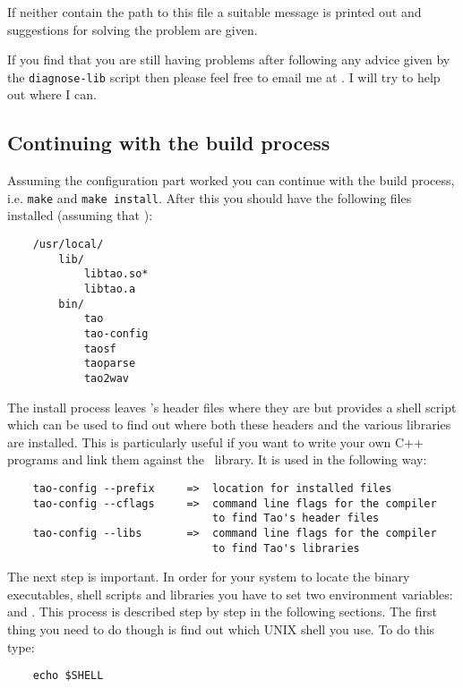 If neither contain the path to this file a suitable message is printed out
and suggestions for solving the problem are given.

If you find that you are still having problems after following any advice
given by the \verb|diagnose-lib| script then please feel free to email
me at .
I will try to help out where I can.

\subsection{Continuing with the build process}
Assuming the configuration part worked you can continue with the
build process, i.e. \verb|make| and \verb|make install|. After
this you should have the following files installed (assuming that
):

\begin{verbatim}
    /usr/local/  
        lib/
            libtao.so*
            libtao.a
        bin/
            tao
            tao-config
            taosf
            taoparse
            tao2wav
\end{verbatim}

The install process leaves \tao's header files where they are but
provides a shell script  which can be used to find out
where both these headers and the various libraries are installed.
This is particularly useful if you want to write your own C++ programs
and link them against the \tao\ library. It is used in the following
way:

\begin{verbatim}
    tao-config --prefix     =>  location for installed files
    tao-config --cflags     =>  command line flags for the compiler
                                to find Tao's header files
    tao-config --libs       =>  command line flags for the compiler
                                to find Tao's libraries
\end{verbatim}

The next step is important. In order for your system to locate
the binary executables, shell scripts and libraries you have to set
two environment variables:  and .
This process is described step by step in the following sections. The
first thing you need to do though is find out which UNIX shell you use.
To do this type:

\begin{verbatim}
    echo $SHELL
\end{verbatim}

